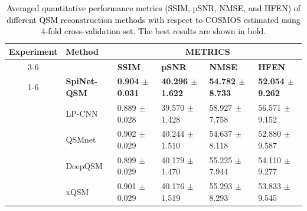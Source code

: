 \documentclass[sn-vancouver,Numbered]{sn-jnl}%
\begin{document}
\begin{table}[htbp]
\centering
\caption{\textcolor{black}{Averaged quantitative performance metrics (SSIM, pSNR, NMSE, and HFEN) of different QSM reconstruction methods with respect to COSMOS estimated using 4-fold cross-validation set. The best results are shown in bold.}}
{\small
\begin{tabular}{clllll}
\hline
\multirow{2}{*}{\textbf{Experiment}}
&\multirow{2}{*}{\textbf{Method}} 
& \multicolumn{4}{c}{\textbf{METRICS}} \\ \cmidrule{3-6} 
&                       
& \textbf{SSIM}     
& \textbf{pSNR}         
& \textbf{NMSE}       
&\textbf{HFEN}  \\ \cmidrule{1-6} 

\multirow{6}{*}{\textbf{Complete data training}}        
& \textbf{SpiNet-QSM}   
&\textbf{0.904 $\pm$ 0.031}	 
&\textbf{40.296 $\pm$ 1.622}	
&\textbf{54.782 $\pm$ 8.733}	 
&\textbf{52.054 $\pm$ 9.262} \\ 
                                
& LP-CNN                
&0.889 $\pm$ 0.028	 
&39.570 $\pm$ 1.428	
&58.927 $\pm$ 7.758	 
&56.571 $\pm$ 9.152\\ 

& QSMnet                
&0.902 $\pm$ 0.029	 
&40.244 $\pm$ 1.510	
&54.637 $\pm$ 8.118	 
&52.880 $\pm$ 9.587\\ 
                                
& DeepQSM               
 &0.899 $\pm$ 0.029   
 &40.179 $\pm$ 1.470    
 &55.225 $\pm$ 7.944  
 &54.110 $\pm$ 9.277 \\ 

& xQSM                
&0.901 $\pm$ 0.029   
&40.176 $\pm$ 1.519    
&55.293 $\pm$ 8.293
&53.833 $\pm$ 9.545 \\ 


\end{tabular}}
\end{table}
\end{document}
